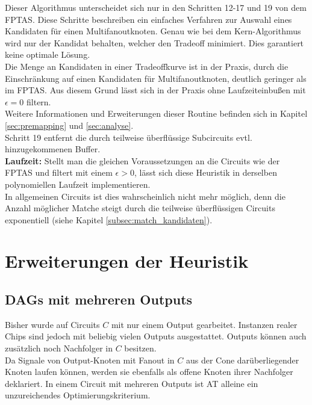 \documentclass[11pt, a4paper, german]{article}
\begin{document}
Dieser Algorithmus unterscheidet sich nur in den Schritten 12-17 und 19 von dem FPTAS. Diese Schritte beschreiben ein einfaches Verfahren zur Auswahl eines Kandidaten für einen Multifanoutknoten. Genau wie bei dem  Kern-Algorithmus wird nur der Kandidat behalten, welcher den Tradeoff minimiert. Dies garantiert keine optimale Lösung. \\
Die Menge an Kandidaten in einer Tradeoffkurve ist in der Praxis, durch die Einschränkung auf einen Kandidaten für Multifanoutknoten, deutlich geringer als im FPTAS. Aus diesem Grund lässt sich in der Praxis ohne Laufzeiteinbußen mit $\epsilon = 0$ filtern.\\ 
Weitere Informationen und Erweiterungen dieser Routine befinden sich in Kapitel \ref{sec:premapping} und \ref{sec:analyse}. \\
Schritt 19 entfernt die durch teilweise überflüssige Subcircuits evtl. hinzugekommenen Buffer.\\

{\bf Laufzeit: } Stellt man die gleichen Voraussetzungen an die Circuits wie der FPTAS und filtert mit einem $\epsilon  > 0$, lässt sich diese Heuristik in derselben polynomiellen Laufzeit implementieren.\\
In allgemeinen Circuits ist dies wahrscheinlich nicht mehr möglich, denn die Anzahl möglicher Matche steigt durch die teilweise überflüssigen Circuits exponentiell  (siehe Kapitel \ref{subsec:match_kandidaten}).


\section{Erweiterungen der Heuristik}
\label{sec:erw_der_heuristik}
\subsection{DAGs mit mehreren Outputs}
\label{sec:outputs}
Bisher wurde auf Circuits $C$ mit nur einem Output gearbeitet. Instanzen realer Chips sind jedoch mit beliebig vielen Outputs ausgestattet. Outputs können auch zusätzlich noch Nachfolger in $C$ besitzen. \\

 Da Signale von Output-Knoten mit Fanout in $C$ aus der Cone darüberliegender Knoten laufen können, werden sie ebenfalls als offene Knoten ihrer Nachfolger deklariert. In einem Circuit mit mehreren Outputs ist AT alleine ein unzureichendes Optimierungskriterium.
\end{document}
